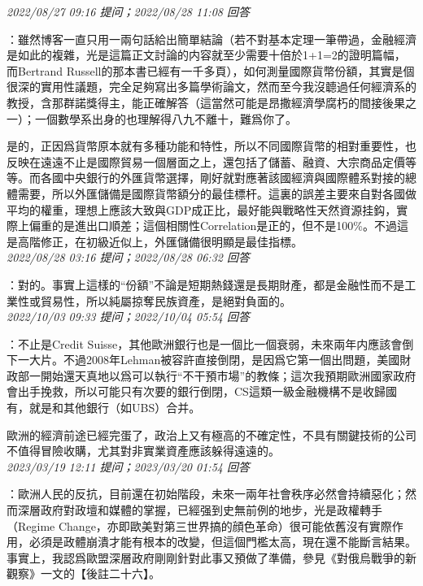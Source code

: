 \documentclass[twocolumn]{ctexart}
\begin{document}
\textit{\hfill\noindent\small 2022/08/27 09:16 提问；2022/08/28 11:08 回答}

：雖然博客一直只用一兩句話給出簡單結論（若不對基本定理一筆帶過，金融經濟是如此的複雜，光是這篇正文討論的内容就至少需要十倍於1+1=2的證明篇幅，而Bertrand Russell的那本書已經有一千多頁），如何測量國際貨幣份額，其實是個很深的實用性議題，完全足夠寫出多篇學術論文，然而至今我沒聼過任何經濟系的教授，含那群諾獎得主，能正確解答（這當然可能是昂撒經濟學腐朽的間接後果之一）；一個數學系出身的也理解得八九不離十，難爲你了。

是的，正因爲貨幣原本就有多種功能和特性，所以不同國際貨幣的相對重要性，也反映在遠遠不止是國際貿易一個層面之上，還包括了儲蓄、融資、大宗商品定價等等。而各國中央銀行的外匯貨幣選擇，剛好就對應著該國經濟與國際體系對接的總體需要，所以外匯儲備是國際貨幣額分的最佳標杆。這裏的誤差主要來自對各國做平均的權重，理想上應該大致與GDP成正比，最好能與戰略性天然資源挂鈎，實際上偏重的是進出口順差；這個相關性Correlation是正的，但不是100\%。不過這是高階修正，在初級近似上，外匯儲備很明顯是最佳指標。
\\

\textit{\hfill\noindent\small 2022/08/28 03:16 提问；2022/08/28 06:32 回答}

：對的。事實上這樣的“份額”不論是短期熱錢還是長期財產，都是金融性而不是工業性或貿易性，所以純屬掠奪民族資產，是絕對負面的。
\\

\textit{\hfill\noindent\small 2022/10/03 09:33 提问；2022/10/04 05:54 回答}

：不止是Credit Suisse，其他歐洲銀行也是一個比一個衰弱，未來兩年内應該會倒下一大片。不過2008年Lehman被容許直接倒閉，是因爲它第一個出問題，美國財政部一開始還天真地以爲可以執行“不干預市場”的教條；這次我預期歐洲國家政府會出手挽救，所以可能只有次要的銀行倒閉，CS這類一級金融機構不是收歸國有，就是和其他銀行（如UBS）合并。

歐洲的經濟前途已經完蛋了，政治上又有極高的不確定性，不具有關鍵技術的公司不值得冒險收購，尤其對非實業資產應該躲得遠遠的。
\\

\textit{\hfill\noindent\small 2023/03/19 12:11 提问；2023/03/20 01:54 回答}

：歐洲人民的反抗，目前還在初始階段，未來一兩年社會秩序必然會持續惡化；然而深層政府對政壇和媒體的掌握，已經强到史無前例的地步，光是政權轉手（Regime Change，亦即歐美對第三世界搞的顔色革命）很可能依舊沒有實際作用，必須是政體崩潰才能有根本的改變，但這個門檻太高，現在還不能斷言結果。事實上，我認爲歐盟深層政府剛剛針對此事又預做了準備，參見《對俄烏戰爭的新觀察》一文的【後註二十六】。
\\
\end{document}
